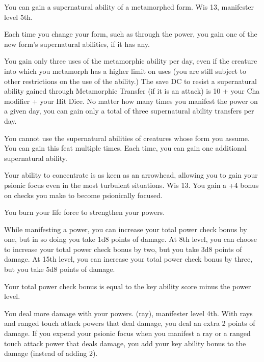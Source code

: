{You can gain a supernatural ability of a metamorphed form.}
{Wis 13, manifester level 5th.}
{Each time you change your form, such as through the  power, you gain one of the new form's supernatural abilities, if it has any.

You gain only three uses of the metamorphic ability per day, even if the creature into which you metamorph has a higher limit on uses (you are still subject to other restrictions on the use of the ability.) The save DC to resist a supernatural ability gained through Metamorphic Transfer (if it is an attack) is 10 + your Cha modifier + \onehalf your Hit Dice. No matter how many times you manifest the  power on a given day, you can gain only a total of three supernatural ability transfers per day.}
{You cannot use the supernatural abilities of creatures whose form you assume.}
{You can gain this feat multiple times. Each time, you can gain one additional supernatural ability.}

{Your ability to concentrate is as keen as an arrowhead, allowing you to gain your psionic focus even in the most turbulent situations.}
{Wis 13.}
{You gain a +4 bonus on  checks you make to become psionically focused.}
{}{}

{You burn your life force to strengthen your powers.}
{}
{While manifesting a power, you can increase your total power check bonus by one, but in so doing you take 1d8 points of damage. At 8th level, you can choose to increase your total power check bonus by two, but you take 3d8 points of damage. At 15th level, you can increase your total power check bonus by three, but you take 5d8 points of damage.

}
{Your total power check bonus is equal to the key ability score minus the power level.}
{}


{You deal more damage with your powers.}
{ (ray), manifester level 4th.}
{With rays and ranged touch attack powers that deal damage, you deal an extra 2 points of damage. If you expend your psionic focus when you manifest a ray or a ranged touch attack power that deals damage, you add your key ability bonus to the damage (instead of adding 2).}
{}{}

